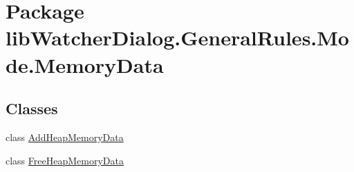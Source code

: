\hypertarget{namespacelib_watcher_dialog_1_1_general_rules_1_1_mode_1_1_memory_data}{\section{Package lib\+Watcher\+Dialog.\+General\+Rules.\+Mode.\+Memory\+Data}
\label{namespacelib_watcher_dialog_1_1_general_rules_1_1_mode_1_1_memory_data}
}
\subsection*{Classes}
\begin{DoxyCompactItemize}
\item 
class \hyperlink{classlib_watcher_dialog_1_1_general_rules_1_1_mode_1_1_memory_data_1_1_add_heap_memory_data}{Add\+Heap\+Memory\+Data}
\item 
class \hyperlink{classlib_watcher_dialog_1_1_general_rules_1_1_mode_1_1_memory_data_1_1_free_heap_memory_data}{Free\+Heap\+Memory\+Data}
\end{DoxyCompactItemize}
